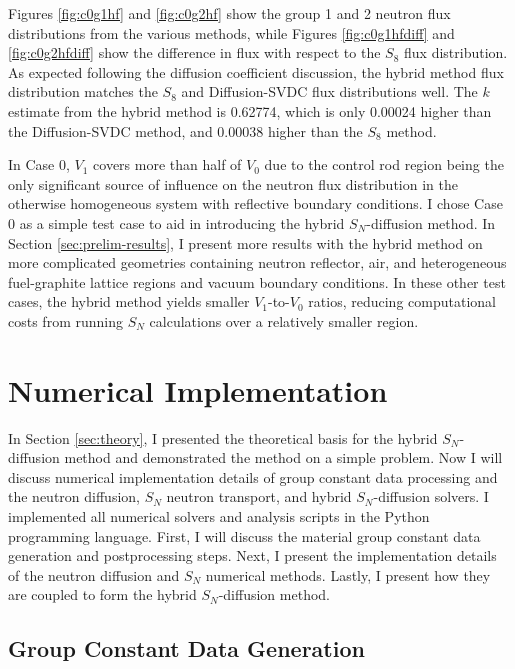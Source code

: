 Figures \ref{fig:c0g1hf} and \ref{fig:c0g2hf} show the group 1 and 2 neutron flux distributions
from the various methods, while Figures \ref{fig:c0g1hfdiff} and \ref{fig:c0g2hfdiff} show the
difference in flux with respect to the $S_8$ flux distribution. As
expected following the diffusion coefficient discussion, the hybrid method flux distribution
matches the $S_8$ and Diffusion-\gls{SVDC} flux distributions well. The $k$ estimate from the
hybrid method is 0.62774, which is only 0.00024 higher than the Diffusion-\gls{SVDC} method, and
0.00038 higher than the $S_8$ method.

In Case 0, $V_1$ covers more than half of $V_0$ due to the control rod region being
the only significant source of influence on the neutron flux distribution in the
otherwise homogeneous system with reflective boundary conditions. I chose Case 0 as a simple test
case to aid in introducing the hybrid $S_N$-diffusion method. In Section \ref{sec:prelim-results},
I present more results with the hybrid method on more complicated geometries containing neutron
reflector, air, and heterogeneous fuel-graphite lattice regions and vacuum boundary conditions. In
these other test cases, the hybrid method yields smaller $V_1$-to-$V_0$ ratios,
reducing computational costs from running $S_N$ calculations over a relatively smaller
region.

\section{Numerical Implementation} \label{sec:implementation}

In Section \ref{sec:theory}, I presented the theoretical basis for the hybrid
$S_N$-diffusion method and demonstrated the method on a simple problem. Now I will discuss
numerical implementation details of group
constant data processing and the neutron diffusion, $S_N$ neutron transport, and hybrid
$S_N$-diffusion solvers. I implemented all numerical solvers and analysis scripts in the Python
programming language. First, I will discuss the material group constant data generation and
postprocessing steps. Next, I present the implementation details of the neutron
diffusion and $S_N$ numerical methods. Lastly, I present how they are coupled to form the hybrid
$S_N$-diffusion method.

\subsection{Group Constant Data Generation}


